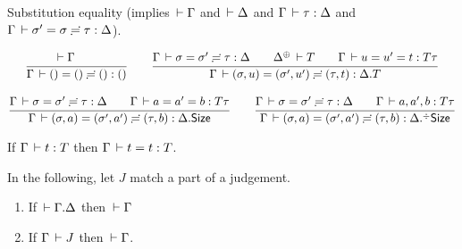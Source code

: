 \documentclass[acmlarge,review,anonymous]{acmart}\settopmatter{printfolios=true}
\begin{document}

Substitution equality
(implies $\,\vdash \Gamma$ and $\,\vdash \Delta$ and $\Gamma \,\vdash \tau : \Delta$ and $\Gamma \,\vdash \sigma' = \sigma \risingdotseq \tau : \Delta$).


\begin{gather*}
  \ru{\der \Gamma \qquad
    }{\sueq \Gamma \sempty \sempty \sempty \cempty}
\qquad
  \ru{\sueq \Gamma \sigma {\sigma'} \tau \Delta \qquad
      \resurrect \Delta \der T \qquad
      \Gamma \der u = u' = t : T \tau
    }{\sueq \Gamma {\sext \sigma u } {\sext {\sigma'} {u'}} {\sext \tau t} {\cext \Delta T}}
\\[2ex]
  \ru{\sueq \Gamma \sigma {\sigma'} \tau \Delta \qquad
      \Gamma \der a = a' = b : T \tau
    }{\sueq \Gamma {\sext \sigma a } {\sext {\sigma'} {a'}} {\sext \tau b} {\cext \Delta \Size}}
\qquad
  \ru{\sueq \Gamma \sigma {\sigma'} \tau \Delta \qquad
      \Gamma \der a, a', b : T \tau
    }{\sueq \Gamma {\sext \sigma a } {\sext {\sigma'} {a'}} {\sext \tau b} {\erext \Delta \Size}}
\end{gather*}

\begin{lemma}[Reflexivity]
  If\/ $\Gamma \,\vdash t : T$ then $\Gamma \,\vdash t = t : T$.
\end{lemma}

In the following, let $J$ %
match a part of a judgement.

\begin{lemma}
\label{lem:cxtwf}\bla
  \begin{enumerate}
  \item If $\,\vdash \Gamma. \Delta$ then $\,\vdash \Gamma$
  \item If\/ $\Gamma \,\vdash J$ then $\,\vdash \Gamma$.
  \end{enumerate}
\end{lemma}
\end{document}
